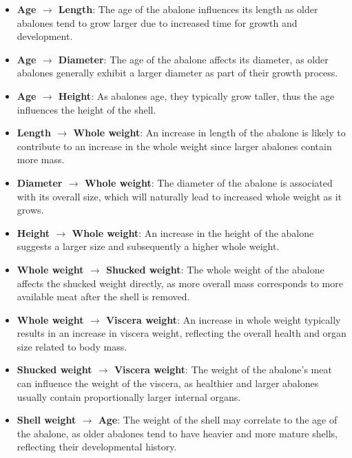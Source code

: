 \documentclass{article}
\begin{document}
\begin{minipage}[t]{0.7\linewidth}
\begin{itemize}
\item \textbf{Age $\rightarrow$ Length}: The age of the abalone influences its length as older abalones tend to grow larger due to increased time for growth and development.

\item \textbf{Age $\rightarrow$ Diameter}: The age of the abalone affects its diameter, as older abalones generally exhibit a larger diameter as part of their growth process.

\item \textbf{Age $\rightarrow$ Height}: As abalones age, they typically grow taller, thus the age influences the height of the shell.

\item \textbf{Length $\rightarrow$ Whole weight}: An increase in length of the abalone is likely to contribute to an increase in the whole weight since larger abalones contain more mass.

\item \textbf{Diameter $\rightarrow$ Whole weight}: The diameter of the abalone is associated with its overall size, which will naturally lead to increased whole weight as it grows.

\item \textbf{Height $\rightarrow$ Whole weight}: An increase in the height of the abalone suggests a larger size and subsequently a higher whole weight.

\item \textbf{Whole weight $\rightarrow$ Shucked weight}: The whole weight of the abalone affects the shucked weight directly, as more overall mass corresponds to more available meat after the shell is removed.

\item \textbf{Whole weight $\rightarrow$ Viscera weight}: An increase in whole weight typically results in an increase in viscera weight, reflecting the overall health and organ size related to body mass.

\item \textbf{Shucked weight $\rightarrow$ Viscera weight}: The weight of the abalone's meat can influence the weight of the viscera, as healthier and larger abalones usually contain proportionally larger internal organs. 

\item \textbf{Shell weight $\rightarrow$ Age}: The weight of the shell may correlate to the age of the abalone, as older abalones tend to have heavier and more mature shells, reflecting their developmental history.
\end{itemize}
\end{minipage}
\end{document}
